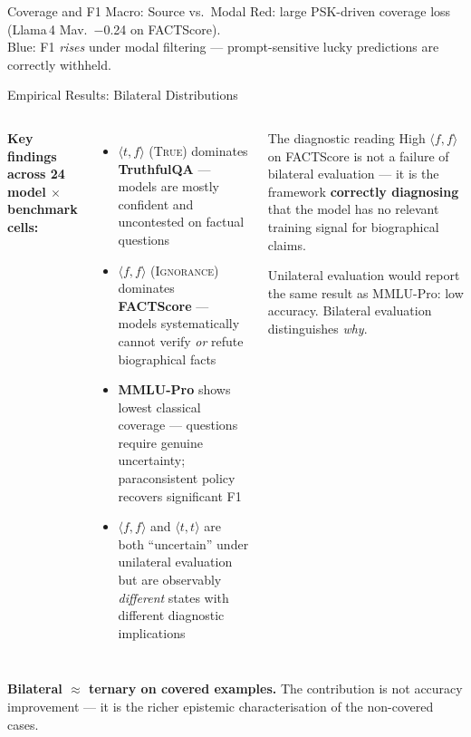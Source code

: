 \documentclass[aspectratio=169,9pt]{beamer}
\newcommand{\tv}[2]{\langle #1,#2 \rangle}
\begin{document}
\begin{frame}{Coverage and F1 Macro: Source vs.\ Modal}
  \smallskip\footnotesize
  \textcolor{falsered}{Red}: large PSK-driven coverage loss (Llama\,4 Mav.\ $-$0.24 on FACTScore).\\
  \textcolor{trueblue}{Blue}: F1 \emph{rises} under modal filtering —
  prompt-sensitive lucky predictions are correctly withheld.

\end{frame}

\begin{frame}{Empirical Results: Bilateral Distributions}

  \begin{columns}[T]
    \textbf{Key findings across 24 model $\times$ benchmark cells:}
    \begin{itemize}\setlength\itemsep{5pt}
      \item \textcolor{trueblue}{$\tv{t}{f}$ (\textsc{True})} dominates \textbf{TruthfulQA} —
            models are mostly confident and uncontested on factual questions
      \item \textcolor{ignorgray}{$\tv{f}{f}$ (\textsc{Ignorance})} dominates \textbf{FACTScore}
            — models systematically cannot verify \emph{or} refute biographical facts
      \item \textbf{MMLU-Pro} shows lowest classical coverage — questions require
            genuine uncertainty; paraconsistent policy recovers significant F1
      \item \textcolor{ignorgray}{$\tv{f}{f}$} and \textcolor{contramber}{$\tv{t}{t}$}
            are both ``uncertain'' under unilateral evaluation but are observably
            \emph{different} states with different diagnostic implications
    \end{itemize}

    \begin{block}{The diagnostic reading}
      High $\tv{f}{f}$ on FACTScore is not a failure of bilateral evaluation
      — it is the framework \textbf{correctly diagnosing} that the model has
      no relevant training signal for biographical claims.

      \medskip
      Unilateral evaluation would report the same result as MMLU-Pro: low accuracy.
      Bilateral evaluation distinguishes \emph{why}.
    \end{block}
  \end{columns}

  \medskip\pause
  \small
  \textbf{Bilateral $\approx$ ternary on covered examples.}
  The contribution is not accuracy improvement — it is the richer
  epistemic characterisation of the non-covered cases.

\end{frame}
\end{document}
